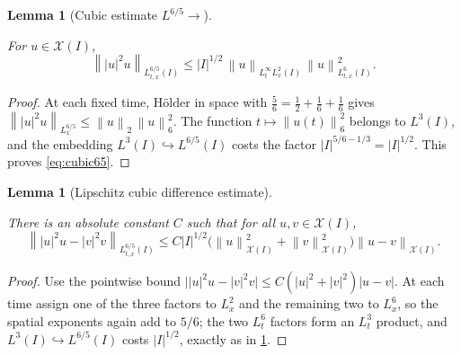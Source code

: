 \documentclass[11pt,oneside]{book}
\providecommand{\uses}[1]{}
\newtheorem{lemma}[theorem]{Lemma}
\theoremstyle{definition}
\theoremstyle{remark}
\newcommand{\1}{\mathbf 1}
\newcommand{\norm}[1]{\left\lVert #1\right\rVert}
\begin{document}
\begin{lemma}[Cubic estimate $L^{6/5}\to$]\label{lem:cubic-65}
\uses{def:fixed-point-space}
For $u\in\mathcal X(I)$,
\begin{equation}
 \norm{|u|^2u}_{L^{6/5}_{t,x}(I)}
 \le |I|^{1/2}\,\norm u_{L^\infty_tL^2_x(I)}\,
                    \norm u_{L^6_{t,x}(I)}^2.       \label{eq:cubic65}
\end{equation}
\end{lemma}

\begin{proof}
\uses{def:scalar-mixed-norm}
At each fixed time, H\"older in space with $\tfrac56=\tfrac12+\tfrac16+\tfrac16$
gives $\norm{|u|^2u}_{L^{6/5}_x}\le\norm{u}_{2}\,\norm{u}_{6}^2$. The function
$t\mapsto\norm{u(t)}_6^2$ belongs to $L^3(I)$, and the embedding
$L^3(I)\hookrightarrow L^{6/5}(I)$ costs the factor
$|I|^{5/6-1/3}=|I|^{1/2}$. This proves \eqref{eq:cubic65}.
\end{proof}

\begin{lemma}[Lipschitz cubic difference estimate]\label{lem:cubic-lip}
\uses{def:fixed-point-space, lem:cubic-65}
There is an absolute constant $C$ such that for all $u,v\in\mathcal X(I)$,
\begin{equation}
 \norm{|u|^2u-|v|^2v}_{L^{6/5}_{t,x}(I)}
 \le C|I|^{1/2}
  \bigl(\norm u_{\mathcal X(I)}^2+\norm v_{\mathcal X(I)}^2\bigr)
  \norm{u-v}_{\mathcal X(I)}.                      \label{eq:cubic-lip}
\end{equation}
\end{lemma}

\begin{proof}
\uses{lem:cubic-65}
Use the pointwise bound $\bigl||u|^2u-|v|^2v\bigr|\le C(|u|^2+|v|^2)|u-v|$.
At each time assign one of the three factors to $L^2_x$ and the remaining two
to $L^6_x$, so the spatial exponents again add to $5/6$; the two $L^6_t$
factors form an $L^3_t$ product, and $L^3(I)\hookrightarrow L^{6/5}(I)$ costs
$|I|^{1/2}$, exactly as in \cref{lem:cubic-65}.
\end{proof}
\end{document}
